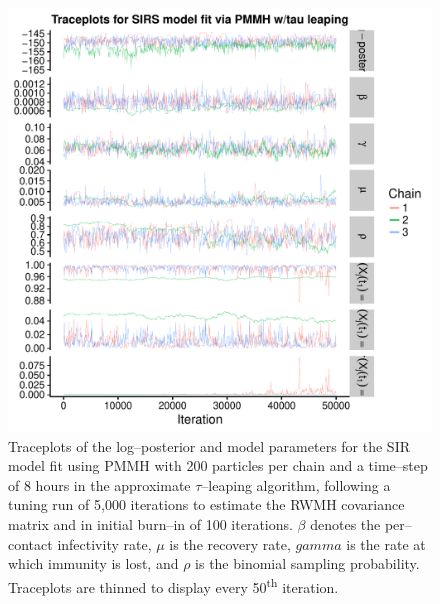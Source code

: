 \begin{figure}[htbp]
	\centering
	\includegraphics[width=0.9\linewidth]{figures/sirs_pomp_approx_traceplots_np200}
	\caption{Traceplots of the log--posterior and model parameters for the SIR model fit using PMMH with 200 particles per chain and a time--step of 8 hours in the approximate $ \tau $--leaping algorithm, following a tuning run of 5,000 iterations to estimate the RWMH covariance matrix and in initial burn--in of 100 iterations. $ \beta $ denotes the per--contact infectivity rate, $ \mu $ is the recovery rate, $ gamma $ is the rate at which immunity is lost, and $ \rho $ is the binomial sampling probability. Traceplots are thinned to display every 50\textsuperscript{th} iteration.}
	\label{fig:sirspompapproxtraceplotsnp200}
\end{figure}


